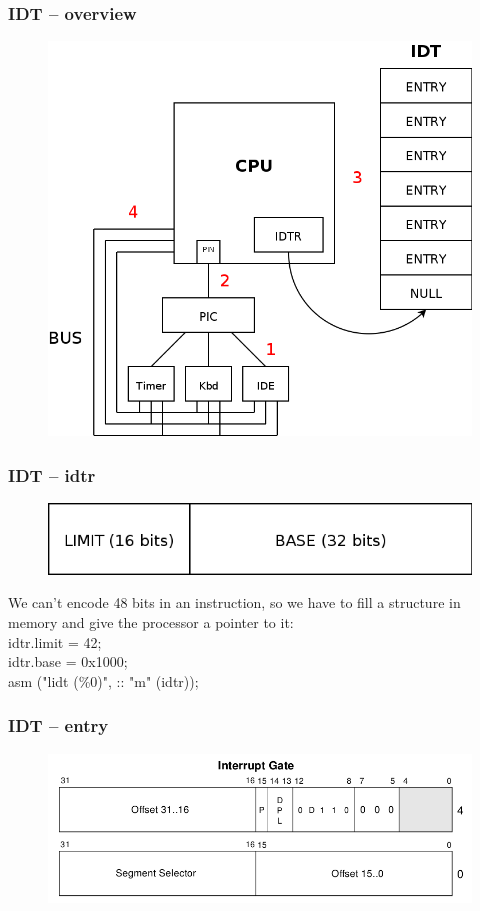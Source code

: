 \documentclass{beamer}
\begin{document}
\begin{frame}
  \frametitle{IDT -- overview}

  \begin{figure}
  \includegraphics[scale=0.2]{idtoverview.png}
  \end{figure}
\end{frame}

\begin{frame}
  \frametitle{IDT -- idtr}

  \begin{figure}
  \includegraphics[scale=0.3]{idtr.png}
  \end{figure}
  We can't encode 48 bits in an instruction, so we have to fill a structure in memory and give the processor a pointer to it:\\
  \vspace{10pt}
  idtr.limit = 42;\\
  idtr.base = 0x1000;\\
  asm ("lidt (\%0)", :: "m" (idtr));
\end{frame}

\begin{frame}
  \frametitle{IDT -- entry}

  \begin{figure}
  \includegraphics[scale=0.38]{idte.png}
  \end{figure}
\end{frame}
\end{document}
